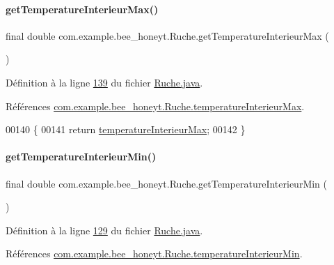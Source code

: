 \paragraph{\texorpdfstring{get\+Temperature\+Interieur\+Max()}{getTemperatureInterieurMax()}}
{\footnotesize\ttfamily final double com.\+example.\+bee\+\_\+honeyt.\+Ruche.\+get\+Temperature\+Interieur\+Max (\begin{DoxyParamCaption}{ }\end{DoxyParamCaption})}



Définition à la ligne \hyperlink{_ruche_8java_source_l00139}{139} du fichier \hyperlink{_ruche_8java_source}{Ruche.\+java}.



Références \hyperlink{_ruche_8java_source_l00026}{com.\+example.\+bee\+\_\+honeyt.\+Ruche.\+temperature\+Interieur\+Max}.


\begin{DoxyCode}
00140     \{
00141         \textcolor{keywordflow}{return} \hyperlink{classcom_1_1example_1_1bee__honeyt_1_1_ruche_af2d8d214dabc9af08329aa3173047245}{temperatureInterieurMax};
00142     \}
\end{DoxyCode}
\mbox{\label{classcom_1_1example_1_1bee__honeyt_1_1_ruche_a8627a17c2f48ceef15f665065da86255}} 
\paragraph{\texorpdfstring{get\+Temperature\+Interieur\+Min()}{getTemperatureInterieurMin()}}
{\footnotesize\ttfamily final double com.\+example.\+bee\+\_\+honeyt.\+Ruche.\+get\+Temperature\+Interieur\+Min (\begin{DoxyParamCaption}{ }\end{DoxyParamCaption})}



Définition à la ligne \hyperlink{_ruche_8java_source_l00129}{129} du fichier \hyperlink{_ruche_8java_source}{Ruche.\+java}.



Références \hyperlink{_ruche_8java_source_l00025}{com.\+example.\+bee\+\_\+honeyt.\+Ruche.\+temperature\+Interieur\+Min}.


